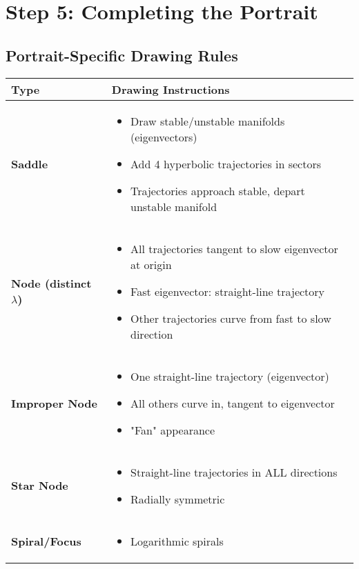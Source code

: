 \documentclass[12pt]{article}
\begin{document}
\section{Step 5: Completing the Portrait}

\subsection{Portrait-Specific Drawing Rules}

\begin{center}
\begin{tabular}{|l|p{8cm}|}
\hline
\textbf{Type} & \textbf{Drawing Instructions} \\
\hline
\hline
\textbf{Saddle} &
\begin{itemize}
    \item Draw stable/unstable manifolds (eigenvectors)
    \item Add 4 hyperbolic trajectories in sectors
    \item Trajectories approach stable, depart unstable manifold
\end{itemize} \\
\hline
\textbf{Node (distinct $\lambda$)} &
\begin{itemize}
    \item All trajectories tangent to slow eigenvector at origin
    \item Fast eigenvector: straight-line trajectory
    \item Other trajectories curve from fast to slow direction
\end{itemize} \\
\hline
\textbf{Improper Node} &
\begin{itemize}
    \item One straight-line trajectory (eigenvector)
    \item All others curve in, tangent to eigenvector
    \item "Fan" appearance
\end{itemize} \\
\hline
\textbf{Star Node} &
\begin{itemize}
    \item Straight-line trajectories in ALL directions
    \item Radially symmetric
\end{itemize} \\
\hline
\textbf{Spiral/Focus} &
\begin{itemize}
    \item Logarithmic spirals

\end{itemize}
\end{tabular}
\end{center}
\end{document}
